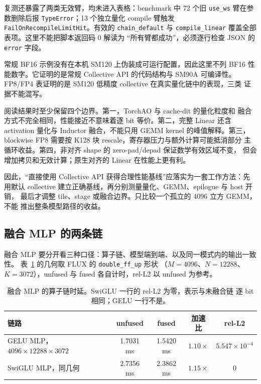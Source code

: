复测还暴露了两类无效臂，均未进入表格：benchmark 中 72 个旧
\texttt{use\_ws} 臂在参数删除后报 \texttt{TypeError}；13 个独立量化 compile
臂触发 \texttt{FailOnRecompileLimitHit}。有效的 \texttt{chain\_default} 与
\texttt{compile\_linear} 覆盖全部表项。这里不能把脚本返回码 0 解读为
“所有臂都成功”，必须逐行检查 JSON 的 \texttt{error} 字段。

常规 BF16 示例没有在本机 SM120 上伪装成可运行配置，因此这里不列 BF16
性能数字。它证明的是常规 Collective API 的代码结构与 SM90A 可编译性。
FP8/FP4 表证明的是 SM120 低精度 collective 在真实量化链中的表现，三类
证据不能混写。

阅读结果时至少保留四个边界。第一，TorchAO 与 cache-dit 的量化粒度和
融合方式不完全相同，性能接近不意味着逐 bit 等价。第二，完整 Linear 还含
activation 量化与 Inductor 融合，不能只用 GEMM kernel 的峰值解释。第三，
blockwise FP8 需要按 K128 块 rescale，寄存器压力与额外计算可能抵消部分
主循环收益。第四，非对齐 shape 的 zero-pad/depad 保证数学有效区域不变，
但会增加拷贝和无效计算；原生对齐的 Linear 在性能上更有利。

因此，“直接使用 Collective API 获得合理性能基线”应落实为一套工作方法：先用默认
collective 建立正确基线，再分别测量量化、GEMM、epilogue 与 host 开销，
最后才调整 tile、stage 或融合边界。只比较一个孤立的 4096 立方 GEMM，不能
推出整条模型路径的收益。

\subsection{融合 MLP 的两条链}

融合 MLP 要分开看三种口径：算子链、模型端到端、以及同一模式内的输出一致性。
表~\ref{tab:41-fused-chain} 的几何取 FLUX 的 \texttt{double\_ff\_up} 形状
（$M=4096$、$N=12288$、$K=3072$），unfused 与 fused 各自计时，rel-L2 以
unfused 为参考。

\begin{table}[H]
\centering\small
\begin{tabular}{lcccc}
\toprule
链路 & unfused & fused & 加速比 & rel-L2 \\
\midrule
GELU MLP，$4096\times12288\times3072$   & 1.7031 ms & 1.5420 ms & $1.10\times$ & $5.547\times10^{-4}$ \\
SwiGLU MLP，同几何 & 2.7356 ms & 2.3862 ms & $1.15\times$ & $0$ \\
\bottomrule
\end{tabular}
\caption{融合 MLP 的算子链时延。SwiGLU 一行的 rel-L2 为零，表示与未融合链
逐 bit 相同；GELU 一行不是。}
\label{tab:41-fused-chain}
\end{table}

